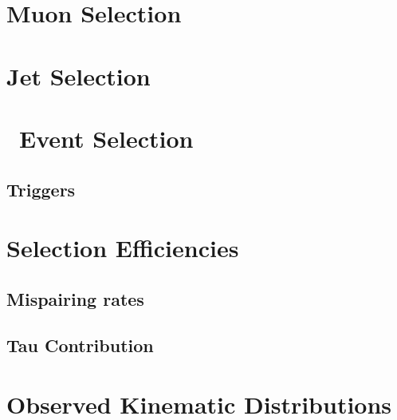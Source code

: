 \section{Muon Selection}
\section{Jet Selection}
\section{\ZZ\ Event Selection}
\subsection{Triggers}
\section{Selection Efficiencies}
\subsection{\CZZ}
\subsection{Mispairing rates}
\subsection{Tau Contribution}
\section{Observed Kinematic Distributions}
